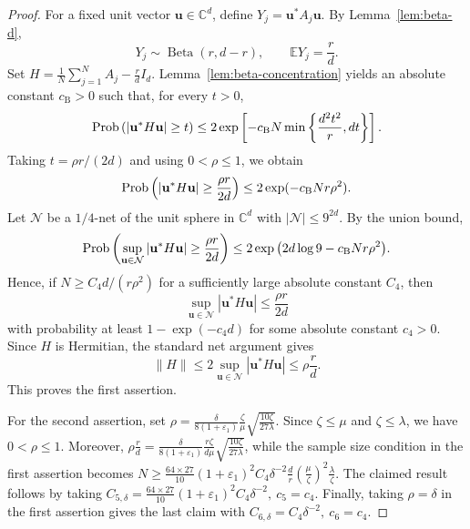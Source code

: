 \documentclass{article}
\newcommand{\C}{{\mathbb C}}
\newcommand{\E}{{\mathbb E}}
\newcommand{\Prob}{{\rm Prob}}
\newcommand{\vu}{{\mathbf u}}
\newcommand{\0}{{\mathbf 0}}
\numberwithin{equation}{section}
\begin{document}
	\begin{proof}
		For a fixed unit vector $\vu\in\C^d$, define $Y_j=\vu^*A_j\vu$. By Lemma~\ref{lem:beta-d},
		\[
		Y_j\sim\operatorname{Beta}(r,d-r),\qquad \E Y_j=\frac rd.
		\]
		Set $H=\frac1N\sum_{j=1}^N A_j-\frac rd I_d$. 
		Lemma~\ref{lem:beta-concentration}  yields an absolute constant $c_{\mathrm B}>0$ such that, for every $t>0$,
		\[
		\Prob\left(|\vu^*H\vu|\ge t\right)
		\le 2\exp\left[-c_{\mathrm B}N\min\left\{\frac{d^2t^2}{r},dt\right\}\right].
		\]
		Taking $t=\rho r/(2d)$ and using $0<\rho\le1$, we obtain
		\[
		\Prob\left(|\vu^*H\vu|\ge\frac{\rho r}{2d}\right)\le 2\exp(-c_{\mathrm B}Nr\rho^2).
		\]
		Let $\mathcal N$ be a $1/4$-net of the unit sphere in $\C^d$ with $|\mathcal N|\le9^{2d}$. By the union bound,
		\[
		\Prob\left(\sup_{\vu\in\mathcal N}|\vu^*H\vu|\ge\frac{\rho r}{2d}\right)
		\le 2\exp\big(2d\log9-c_{\mathrm B}Nr\rho^2\big).
		\]
		Hence, if $N\ge C_4d/(r\rho^2)$ for a sufficiently large absolute constant $C_4$, then
		\[
		\sup_{\vu\in\mathcal N}|\vu^*H\vu|\le\frac{\rho r}{2d}
		\]
		with probability at least $1-\exp(-c_4d)$ for some absolute constant $c_4>0$. Since $H$ is Hermitian, the standard net argument gives
		\[
		\|H\|\le2\sup_{\vu\in\mathcal N}|\vu^*H\vu|\le\rho\frac rd.
		\]
		This proves the first assertion.
		
		For the second assertion, set
		$\rho=\frac\delta{8(1+\varepsilon_1)}\frac{\zeta}{\mu}\sqrt{\frac{10\zeta}{27\lambda}}$. 
		Since $\zeta\le\mu$ and $\zeta\le\lambda$, we have $0<\rho\le1$. Moreover, $
		\rho\frac rd=\frac\delta{8(1+\varepsilon_1)} \frac{r\zeta}{d\mu}\sqrt{\frac{10\zeta}{27\lambda}}$, 
		while the sample size condition in the first assertion becomes $
		N\ge {\frac{64\times 27}{10}(1+\varepsilon_1)^2}C_4\delta^{-2}\frac dr\left(\frac{\mu}{\zeta}\right)^2\frac{\lambda}{\zeta}$. 
		The claimed result follows by taking 
		$C_{5,\delta}={\frac{64\times 27}{10}(1+\varepsilon_1)^2}C_4\delta^{-2},\ c_{5}=c_4$. Finally, taking $\rho=\delta$ in the first assertion gives the last claim with $C_{6,\delta}=C_4\delta^{-2},\ c_{6}=c_4$.
	\end{proof}
	
\end{document}
